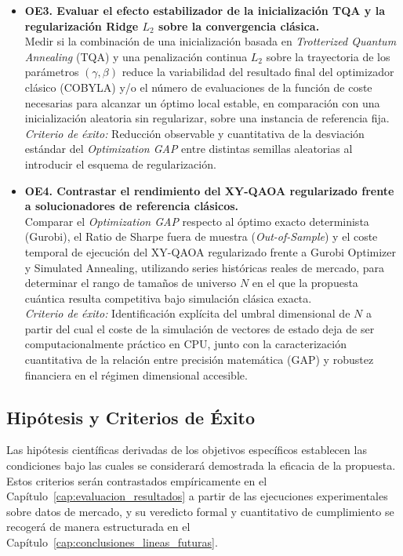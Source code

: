 \begin{itemize}
    \item \textbf{OE3. Evaluar el efecto estabilizador de la inicialización TQA y la regularización Ridge $L_2$ sobre la convergencia clásica.} \\
    Medir si la combinación de una inicialización basada en \textit{Trotterized Quantum Annealing} (TQA) y una penalización continua $L_2$ sobre la trayectoria de los parámetros $(\gamma, \beta)$ reduce la variabilidad del resultado final del optimizador clásico (COBYLA) y/o el número de evaluaciones de la función de coste necesarias para alcanzar un óptimo local estable, en comparación con una inicialización aleatoria sin regularizar, sobre una instancia de referencia fija. \\
    \textit{Criterio de éxito:} Reducción observable y cuantitativa de la desviación estándar del \textit{Optimization GAP} entre distintas semillas aleatorias al introducir el esquema de regularización.

    \item \textbf{OE4. Contrastar el rendimiento del XY-QAOA regularizado frente a solucionadores de referencia clásicos.} \\
    Comparar el \textit{Optimization GAP} respecto al óptimo exacto determinista (Gurobi), el Ratio de Sharpe fuera de muestra (\textit{Out-of-Sample}) y el coste temporal de ejecución del XY-QAOA regularizado frente a Gurobi Optimizer y Simulated Annealing, utilizando series históricas reales de mercado, para determinar el rango de tamaños de universo $N$ en el que la propuesta cuántica resulta competitiva bajo simulación clásica exacta. \\
    \textit{Criterio de éxito:} Identificación explícita del umbral dimensional de $N$ a partir del cual el coste de la simulación de vectores de estado deja de ser computacionalmente práctico en CPU, junto con la caracterización cuantitativa de la relación entre precisión matemática (GAP) y robustez financiera en el régimen dimensional accesible.
\end{itemize}

\subsection{Hipótesis y Criterios de Éxito}
\label{subsec:hipotesis_criterios_exito}

Las hipótesis científicas derivadas de los objetivos específicos establecen las condiciones bajo las cuales se considerará demostrada la eficacia de la propuesta. Estos criterios serán contrastados empíricamente en el Capítulo~\ref{cap:evaluacion_resultados} a partir de las ejecuciones experimentales sobre datos de mercado, y su veredicto formal y cuantitativo de cumplimiento se recogerá de manera estructurada en el Capítulo~\ref{cap:conclusiones_lineas_futuras}. 

